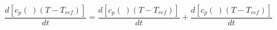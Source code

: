 \begin{equation}
\frac{d [c_p(\ ) (T- T_{ref})]}{dt} = \frac{d [c_p(\ ) (T- T_{ref})]}{dt} + \frac{d [c_p(\ ) (T- T_{ref})]}{dt}
\end{equation}